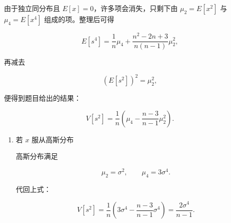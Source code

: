 \begin{question}
\begin{solution}
由于独立同分布且 \(E[x]=0\)，许多项会消失，只剩下由 \(\mu_2=E[x^2]\) 与
\(\mu_4=E[x^4]\) 组成的项。整理后可得

\[
E[s^4]=\frac1n\mu_4+
\frac{n^2-2n+3}{n(n-1)}\mu_2^2,
\]

再减去

\[
(E[s^2])^2=\mu_2^2,
\]

便得到题目给出的结果：

\[
V[s^2]=\frac1n\left(\mu_4-\frac{n-3}{n-1}\mu_2^2\right).
\]

\begin{enumerate}[start=2]
\item 若 \(x\) 服从高斯分布

高斯分布满足

\[
\mu_2=\sigma^2,\qquad \mu_4=3\sigma^4.
\]

代回上式：

\[
V[s^2]
=\frac1n\left(3\sigma^4-\frac{n-3}{n-1}\sigma^4\right)
=\frac{2\sigma^4}{n-1}.
\]
\end{enumerate}
\end{solution}
\end{question}

